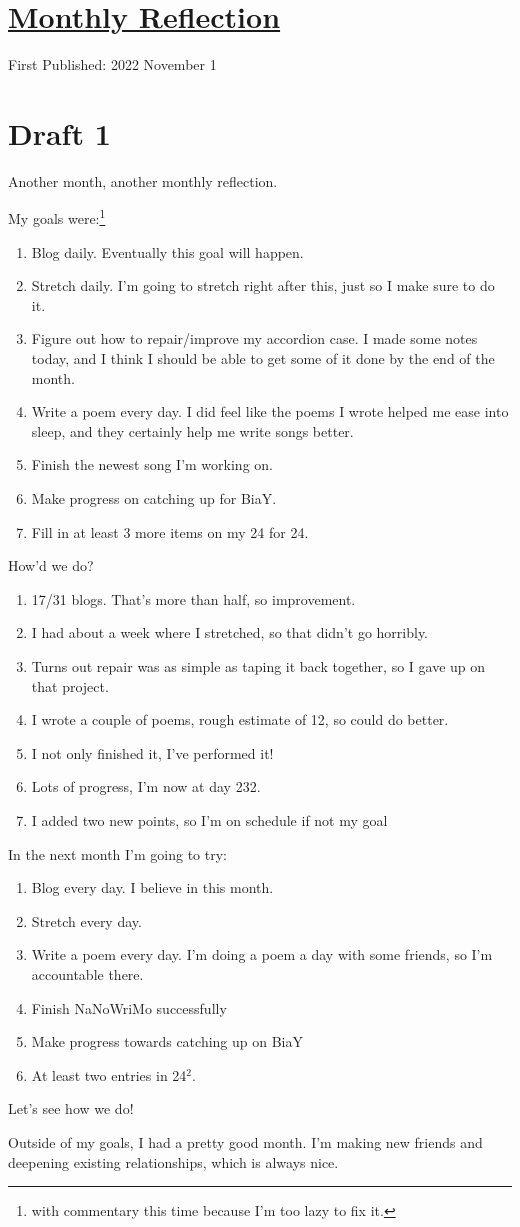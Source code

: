 \documentclass[12pt]{article}[titlepage]
\renewcommand{\,}{\textsuperscript{,}}
\begin{document}
\doublespacing
\section{\href{reflection-october-2022.html}{Monthly Reflection}}
First Published: 2022 November 1

\section{Draft 1}
Another month, another monthly reflection.

My goals were:\footnote{with commentary this time because I'm too lazy to fix it.}
\begin{enumerate}
\item Blog daily. Eventually this goal will happen.
\item Stretch daily. I'm going to stretch right after this, just so I make sure to do it.
\item Figure out how to repair/improve my accordion case. I made some notes today, and I think I should be able to get some of it done by the end of the month.
\item Write a poem every day. I did feel like the poems I wrote helped me ease into sleep, and they certainly help me write songs better.
\item Finish the newest song I'm working on. 
\item Make progress on catching up for BiaY.
\item Fill in at least 3 more items on my 24 for 24.
\end{enumerate}

How'd we do?
\begin{enumerate}
\item 17/31 blogs. That's more than half, so improvement.
\item I had about a week where I stretched, so that didn't go horribly.
\item Turns out repair was as simple as taping it back together, so I gave up on that project.
\item I wrote a couple of poems, rough estimate of 12, so could do better.
\item I not only finished it, I've performed it!
\item Lots of progress, I'm now at day 232.
\item I added two new points, so I'm on schedule if not my goal
\end{enumerate}

In the next month I'm going to try:
\begin{enumerate}
\item Blog every day. I believe in this month.
\item Stretch every day.
\item Write a poem every day. I'm doing a poem a day with some friends, so I'm accountable there.
\item Finish NaNoWriMo successfully
\item Make progress towards catching up on BiaY
\item At least two entries in 24$^2$.
\end{enumerate}
Let's see how we do!

Outside of my goals, I had a pretty good month.
I'm making new friends and deepening existing relationships, which is always nice.
\end{document}
